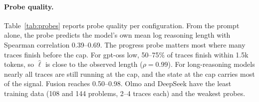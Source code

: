 \documentclass{article}
\begin{document}
\begin{table}[t]
  \caption{Probe quality and deployed settings per configuration (pool: 322 problems; Olmo 108, DeepSeek 144). $\rho$: Spearman correlation between out-of-fold predictions and the true mean log trace length on the pool. AUC: threshold-free AUC of $-s_m$ on the official training cases. $L_m$: prompt-probe layer; $B_m$, $K$: token cap and number of traces at test time.}
  \label{tab:probes}
  \centering
\end{table}

\paragraph{Probe quality.}
Table~\ref{tab:probes} reports probe quality per configuration.
From the prompt alone, the probe predicts the model's own mean log reasoning length with Spearman correlation 0.39--0.69.
The progress probe matters most where many traces finish before the cap.
For gpt-oss low, 50--75\% of traces finish within 1.5k tokens, so $\hat\ell$ is close to the observed length ($\rho = 0.99$).
For long-reasoning models nearly all traces are still running at the cap, and the state at the cap carries most of the signal.
Fusion reaches 0.50--0.98.
Olmo and DeepSeek have the least training data (108 and 144 problems, 2--4 traces each) and the weakest probes.
\end{document}

